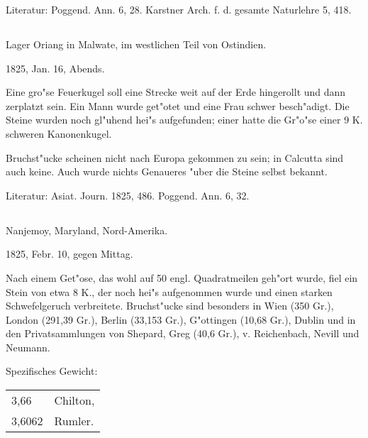 \documentclass[a4paper, 11pt, oneside]{article}
\begin{document}
\normalsize
Literatur: Poggend. Ann. 6, 28. Karstner Arch. f. d. gesamte Naturlehre 5, 418.

\subsection{}
\LARGE
\paragraph{}
Lager Oriang in Malwate, im westlichen Teil von Ostindien.

1825, Jan. 16, Abends.

Eine gro"se Feuerkugel soll eine Strecke weit auf der Erde hingerollt und dann zerplatzt sein. Ein Mann wurde get"otet und eine Frau schwer besch"adigt. Die Steine wurden noch gl"uhend hei"s aufgefunden; einer hatte die Gr"o"se einer 9 K. schweren Kanonenkugel.

Bruchst"ucke scheinen nicht nach Europa gekommen zu sein; in Calcutta sind auch keine. Auch wurde nichts Genaueres "uber die Steine selbst bekannt.

\normalsize
Literatur: Asiat. Journ. 1825, 486. Poggend. Ann. 6, 32.

\subsection{}
\LARGE
\paragraph{}
Nanjemoy, Maryland, Nord-Amerika.

1825, Febr. 10, gegen Mittag.

Nach einem Get"ose, das wohl auf 50 engl. Quadratmeilen geh"ort wurde, fiel ein Stein von etwa 8 K., der noch hei"s aufgenommen wurde und einen starken Schwefelgeruch verbreitete. Bruchst"ucke sind besonders in Wien (350 Gr.), London (291,39 Gr.), Berlin (33,153 Gr.), G"ottingen (10,68 Gr.), Dublin und in den Privatsammlungen von Shepard, Greg (40,6 Gr.), v. Reichenbach, Nevill und Neumann.

Spezifisches Gewicht:
\begin{table}[!ht]
    \centering\swabfamily\Large
    \begin{tabular}{l l}
        3,66 & Chilton,\\
        3,6062 & Rumler.
    \end{tabular}
\end{table}
\end{document}
